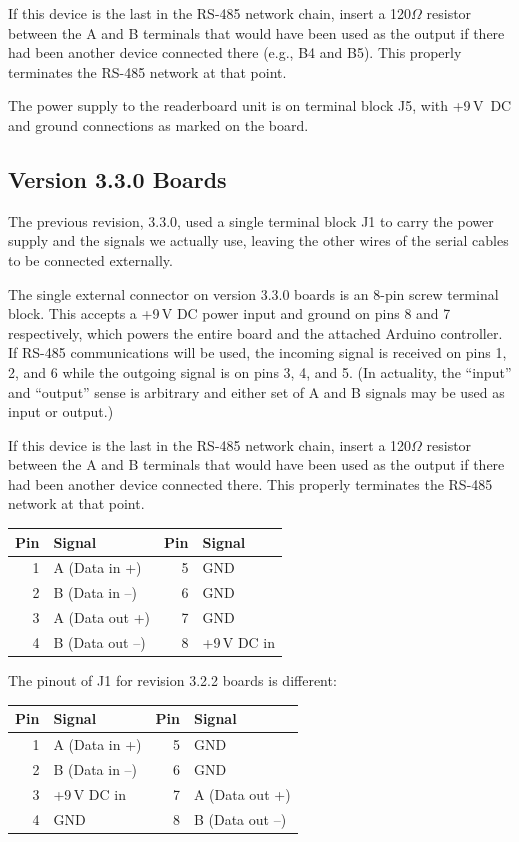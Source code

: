 If this device is the last in the RS-485 network chain, insert a 120$\Omega$ resistor between the A and B terminals
that would have been used as the output if there had been another device connected there (e.g., B4 and B5). This properly terminates
the RS-485 network at that point.

The power supply to the readerboard unit is on terminal block J5, with +9\,V~DC and ground connections as marked
on the board.

\subsection{Version 3.3.0 Boards}
The previous revision, 3.3.0, used a single terminal block J1 to carry the power supply and the  signals
we actually use, leaving the other wires of the serial cables to be connected externally.

The single external connector on version 3.3.0 boards is an 8-pin screw terminal block. This accepts a +9\,V DC power input
and ground on pins 8 and 7 respectively, which powers the entire board and the attached Arduino controller.  If RS-485
communications will be used, the incoming signal is received on pins 1, 2, and 6 while the outgoing signal is on
pins 3, 4, and 5. (In actuality, the ``input'' and ``output'' sense is arbitrary and either set of A and B signals
may be used as input or output.) 

If this device is the last in the RS-485 network chain, insert a 120$\Omega$ resistor between the A and B terminals
that would have been used as the output if there had been another device connected there. This properly terminates
the RS-485 network at that point.
\begin{center}
	\begin{tabular}{rl|rl}\toprule
		\bfseries Pin & \bfseries Signal &
		\bfseries Pin & \bfseries Signal \\\midrule
		1&A (Data in +)    &5&GND\\
		2&B (Data in --)   &6&GND\\
		3&A (Data out +)   &7&GND\\
		4&B (Data out --)  &8&+9\,V DC in\\\bottomrule
	\end{tabular}
\end{center}

The pinout of J1 for revision 3.2.2 boards is different:
\begin{center}
	\begin{tabular}{rl|rl}\toprule
		\bfseries Pin & \bfseries Signal &
		\bfseries Pin & \bfseries Signal \\\midrule
		1&A (Data in +)    &5&GND\\
		2&B (Data in --)   &6&GND\\
		3&+9\,V DC in      &7&A (Data out +)\\
		4&GND              &8&B (Data out --)\\\bottomrule
	\end{tabular}
\end{center}

